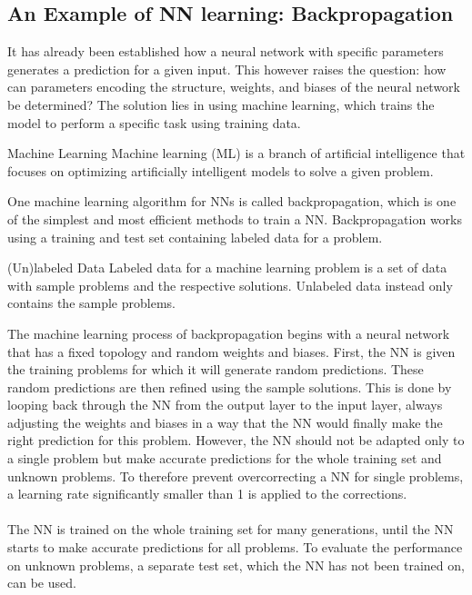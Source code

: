 \subsection{An Example of NN learning: Backpropagation}\label{subsec:an-example-of-nn-learning:-backpropagation}
It has already been established how a neural network with specific parameters generates a prediction for a given input.
This however raises the question: how can parameters encoding the structure, weights, and biases of the neural network be determined?
The solution lies in using machine learning, which trains the model to perform a specific task using training data.
\begin{mydef}{Machine Learning}
    Machine learning (ML) is a branch of artificial intelligence that focuses on optimizing artificially intelligent models to solve a given problem.\cite{IBM_Machine_Learning}
\end{mydef}
One machine learning algorithm for NNs is called backpropagation, which is one of the simplest and most efficient methods to train a NN.\cite{Al-Masri2024}
Backpropagation works using a training and test set containing labeled data for a problem.
\begin{mydef}{(Un)labeled Data}
    Labeled data for a machine learning problem is a set of data with sample problems and the respective solutions.
    Unlabeled data instead only contains the sample problems.\cite{IBM_Data_Labeling}
\end{mydef}
The machine learning process of backpropagation begins with a neural network that has a fixed topology and random weights and biases.
First, the NN is given the training problems for which it will generate random predictions.
These random predictions are then refined using the sample solutions.
This is done by looping back through the NN from the output layer to the input layer, always adjusting the weights and biases in a way that the NN would finally make the right prediction for this problem.
However, the NN should not be adapted only to a single problem but make accurate predictions for the whole training set and unknown problems.
To therefore prevent overcorrecting a NN for single problems, a learning rate significantly smaller than 1 is applied to the corrections.
\\ \\
The NN is trained on the whole training set for many generations, until the NN starts to make accurate predictions for all problems.
To evaluate the performance on unknown problems, a separate test set, which the NN has not been trained on, can be used.


